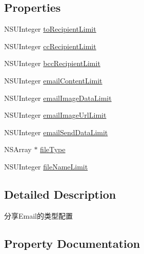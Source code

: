\subsection*{Properties}
\begin{DoxyCompactItemize}
\item 
N\+S\+U\+Integer \mbox{\hyperlink{interface_u_m_social_share_email_object_config_a4d0078636f28c3f823070562d97f97a0}{to\+Recipient\+Limit}}
\item 
N\+S\+U\+Integer \mbox{\hyperlink{interface_u_m_social_share_email_object_config_a721e9721edb502b47761188e75ec21e8}{cc\+Recipient\+Limit}}
\item 
N\+S\+U\+Integer \mbox{\hyperlink{interface_u_m_social_share_email_object_config_a62c9a5f58b1e53d6d24809188b369fa4}{bcc\+Recipient\+Limit}}
\item 
N\+S\+U\+Integer \mbox{\hyperlink{interface_u_m_social_share_email_object_config_ae925383cb53e95f677b06c906ca2a603}{email\+Content\+Limit}}
\item 
N\+S\+U\+Integer \mbox{\hyperlink{interface_u_m_social_share_email_object_config_adcfdad94a293cee46e465c54b37d1ae7}{email\+Image\+Data\+Limit}}
\item 
N\+S\+U\+Integer \mbox{\hyperlink{interface_u_m_social_share_email_object_config_ad3cc2a918c8c83c43d3b181e126e1d24}{email\+Image\+Url\+Limit}}
\item 
N\+S\+U\+Integer \mbox{\hyperlink{interface_u_m_social_share_email_object_config_a4504e15325c6b811f4e26c15f721e589}{email\+Send\+Data\+Limit}}
\item 
N\+S\+Array $\ast$ \mbox{\hyperlink{interface_u_m_social_share_email_object_config_af9e5bfe1969223dc028d6546696cdfa4}{file\+Type}}
\item 
N\+S\+U\+Integer \mbox{\hyperlink{interface_u_m_social_share_email_object_config_a0c1389b63bce26d2b95d3b102f490fec}{file\+Name\+Limit}}
\end{DoxyCompactItemize}


\subsection{Detailed Description}
分享\+Email的类型配置 

\subsection{Property Documentation}
\mbox{\label{interface_u_m_social_share_email_object_config_a62c9a5f58b1e53d6d24809188b369fa4}} 
